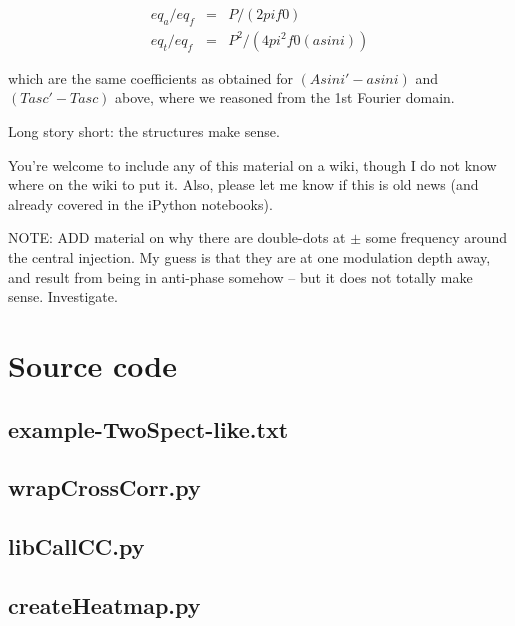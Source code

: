 \documentclass{article}
\begin{document}
\begin{eqnarray}
eq_a / eq_f &=& P / (2 pi f0)\\
eq_t / eq_f &=& P^2/(4 pi^2 f0 (a sin i))
\end{eqnarray}

which are the same coefficients as obtained for $(Asini' - a sin i)$ and
$(Tasc' - Tasc)$ above, where we reasoned from the 1st Fourier domain.

Long story short: the structures make sense.

You're welcome to include any of this material on a wiki, though I do
not know where on the wiki to put it. Also, please let me know if this
is old news (and already covered in the iPython notebooks).


NOTE: ADD material on why there are double-dots at $\pm$ some frequency around the central injection. My guess is that they are at one modulation depth away, and result from being in anti-phase somehow -- but it does not totally make sense. Investigate.

\newpage

\appendix
\section{Source code}
\label{source_code_appendix}

\subsection{example-TwoSpect-like.txt}

\subsection{wrapCrossCorr.py}

\subsection{libCallCC.py}

\subsection{createHeatmap.py}

\end{document}
